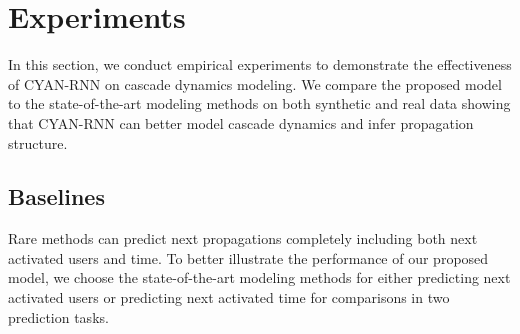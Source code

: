 \section{Experiments}
\label{sec:exp}
In this section, we conduct empirical experiments to demonstrate the
effectiveness of CYAN-RNN on cascade dynamics modeling. We compare the proposed
model to the state-of-the-art modeling methods on both
synthetic and real data showing that CYAN-RNN can better model cascade dynamics
and infer propagation structure.

\subsection{Baselines}

Rare methods can predict next propagations completely including both next
activated users and time. To better illustrate the performance of our
proposed model, we choose the state-of-the-art modeling methods for either
predicting next activated users or predicting next activated time for comparisons in two
prediction tasks.


